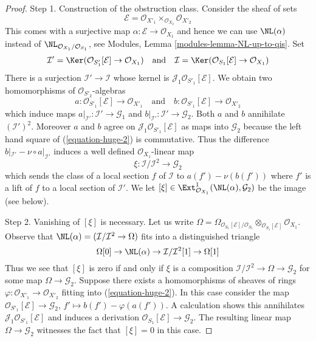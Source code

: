 \begin{proof}
\medskip\noindent
Step 1. Construction of the obstruction class. Consider the sheaf
of sets
$$
\mathcal{E} = \mathcal{O}_{X'_1} \times_{\mathcal{O}_{X_2}} \mathcal{O}_{X'_2}
$$
This comes with a surjective map $\alpha : \mathcal{E} \to \mathcal{O}_{X_1}$
and hence we can use $\NL(\alpha)$ instead of
$\NL_{\mathcal{O}_{X_1}/\mathcal{O}_{S_1}}$, see
Modules, Lemma \ref{modules-lemma-NL-up-to-qis}.
Set
$$
\mathcal{I}' =
\Ker(\mathcal{O}_{S'_1}[\mathcal{E}] \to \mathcal{O}_{X_1})
\quad\text{and}\quad
\mathcal{I} =
\Ker(\mathcal{O}_{S_1}[\mathcal{E}] \to \mathcal{O}_{X_1})
$$
There is a surjection $\mathcal{I}' \to \mathcal{I}$ whose kernel
is $\mathcal{J}_1\mathcal{O}_{S'_1}[\mathcal{E}]$.
We obtain two homomorphisms of $\mathcal{O}_{S'_2}$-algebras
$$
a : \mathcal{O}_{S'_1}[\mathcal{E}] \to \mathcal{O}_{X'_1}
\quad\text{and}\quad
b : \mathcal{O}_{S'_1}[\mathcal{E}] \to \mathcal{O}_{X'_2}
$$
which induce maps $a|_{\mathcal{I}'} : \mathcal{I}' \to \mathcal{G}_1$ and
$b|_{\mathcal{I}'} : \mathcal{I}' \to \mathcal{G}_2$. Both $a$ and $b$
annihilate $(\mathcal{I}')^2$. Moreover $a$ and $b$ agree on
$\mathcal{J}_1\mathcal{O}_{S'_1}[\mathcal{E}]$ as maps into $\mathcal{G}_2$
because the left hand square of (\ref{equation-huge-2}) is commutative.
Thus the difference
$b|_{\mathcal{I}'} - \nu \circ a|_{\mathcal{I}'}$
induces a well defined $\mathcal{O}_{X_1}$-linear map
$$
\xi : \mathcal{I}/\mathcal{I}^2 \longrightarrow \mathcal{G}_2
$$
which sends the class of a local section $f$ of $\mathcal{I}$ to
$a(f') - \nu(b(f'))$ where $f'$ is a lift of $f$ to a local
section of $\mathcal{I}'$. We let
$[\xi] \in \Ext^1_{\mathcal{O}_{X_1}}(\NL(\alpha), \mathcal{G}_2)$
be the image (see below).

\medskip\noindent
Step 2. Vanishing of $[\xi]$ is necessary. Let us write
$\Omega = \Omega_{\mathcal{O}_{S_1}[\mathcal{E}]/\mathcal{O}_{S_1}}
\otimes_{\mathcal{O}_{S_1}[\mathcal{E}]} \mathcal{O}_{X_1}$.
Observe that $\NL(\alpha) = (\mathcal{I}/\mathcal{I}^2 \to \Omega)$
fits into a distinguished triangle
$$
\Omega[0] \to
\NL(\alpha) \to
\mathcal{I}/\mathcal{I}^2[1] \to
\Omega[1]
$$
Thus we see that $[\xi]$ is zero if and only if $\xi$
is a composition $\mathcal{I}/\mathcal{I}^2 \to \Omega \to \mathcal{G}_2$
for some map $\Omega \to \mathcal{G}_2$. Suppose there exists a
homomorphisms of sheaves of rings
$\varphi : \mathcal{O}_{X'_1} \to \mathcal{O}_{X'_2}$ fitting into
(\ref{equation-huge-2}). In this case consider the map
$\mathcal{O}_{S'_1}[\mathcal{E}] \to \mathcal{G}_2$,
$f' \mapsto b(f') - \varphi(a(f'))$. A calculation
shows this annihilates $\mathcal{J}_1\mathcal{O}_{S'_1}[\mathcal{E}]$
and induces a derivation $\mathcal{O}_{S_1}[\mathcal{E}] \to \mathcal{G}_2$.
The resulting linear map $\Omega \to \mathcal{G}_2$ witnesses the
fact that $[\xi] = 0$ in this case.


\end{proof}
